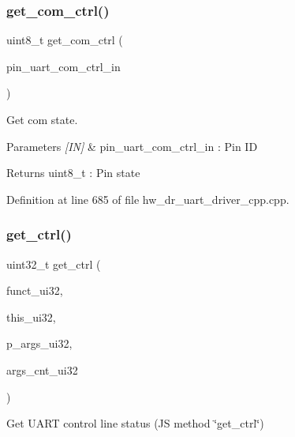 \mbox{\label{group___u_a_r_t_gaf070b0aac7f9ea22546b9e26c8a44ac4}} 
\subsubsection{get\_com\_ctrl()}
{\footnotesize\ttfamily uint8\+\_\+t get\+\_\+com\+\_\+ctrl (\begin{DoxyParamCaption}\item[{\textbf{ uart\+\_\+com\+\_\+ctrl\+\_\+in\+\_\+t}}]{pin\+\_\+uart\+\_\+com\+\_\+ctrl\+\_\+in }\end{DoxyParamCaption})}



Get com state. 


\begin{DoxyParams}{Parameters}
{\em \mbox{[}\+I\+N\mbox{]}} & pin\+\_\+uart\+\_\+com\+\_\+ctrl\+\_\+in \+: Pin ID \\
\hline
\end{DoxyParams}
\begin{DoxyReturn}{Returns}
uint8\+\_\+t \+: Pin state 
\end{DoxyReturn}


Definition at line 685 of file hw\+\_\+dr\+\_\+uart\+\_\+driver\+\_\+cpp.\+cpp.

\mbox{\label{group___u_a_r_t_ga1ce6c12b73f1236771ba9854d8fa400e}} 
\subsubsection{get\_ctrl()}
{\footnotesize\ttfamily uint32\+\_\+t get\+\_\+ctrl (\begin{DoxyParamCaption}\item[{const uint32\+\_\+t}]{funct\+\_\+ui32,  }\item[{const uint32\+\_\+t}]{this\+\_\+ui32,  }\item[{const uint32\+\_\+t $\ast$}]{p\+\_\+args\+\_\+ui32,  }\item[{const uint32\+\_\+t}]{args\+\_\+cnt\+\_\+ui32 }\end{DoxyParamCaption})\hspace{0.3cm}{\ttfamily [static]}}



Get U\+A\+RT control line status (JS method \char`\"{}get\+\_\+ctrl\char`\"{}) 


